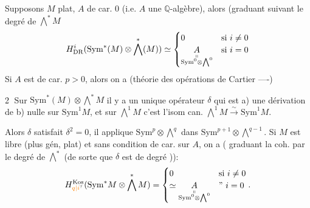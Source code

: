 Supposons $M$ plat,  $A$ de car. 0 (i.e. $A$ une $\mathbb Q$-algèbre), alors
 (graduant suivant le degré de $\bigwedge^\ast M$
\[
H^i_{\mathrm{DR}}(\mathrm{Sym}^{\ast}(M)\otimes\bigwedge^{\ast}(M))\simeq
\begin{cases}0&\text{si }i\ne0\\
\underset{\substack{\shortparallel\\[-2pt]\mathrm{Sym}^{0}\otimes\bigwedge^{0}}}{A}&\text{si }i=0\end{cases}
\]
Si $A$ est de car. $p>0$, alors on a  (théorie des opérations de Cartier ----)

\textcircled{2} Sur $\mathrm{Sym}^{\ast}(M)\otimes\bigwedge^\ast M$  il y a un unique opérateur $\delta$ qui est 
a) une dérivation  de  
b) nulle sur  $\mathrm{Sym}^{1}M$, et sur $\bigwedge^{1}M$ c'est l'isom can. $\bigwedge^{1}M\xrightarrow{\sim}\mathrm{Sym}^{1}M$.

Alors $\delta$ satisfait $\delta^2=0$, il applique $\mathrm{Sym}^{p}\otimes\bigwedge^{q}$ dans $\mathrm{Sym}^{p+1}\otimes\bigwedge^{q-1}$. Si $M$ est libre (plus gén, plat) et sans condition de car. sur $A$, on a ( graduant la coh. par le degré de $\bigwedge^{\ast}$ 
(de sorte que $\delta$ est de degré )):
\[
H^{\mathrm{Kos}}_{\unsure{q|i}}(\mathrm{Sym}^{\ast}M\otimes\bigwedge^\ast M)=
\begin{cases}0&\text{si }i\ne0\\
\simeq\underset{\substack{\shortparallel\\[-2pt]\mathrm{Sym}^{0}\otimes\bigwedge^{0}}}{A}&\text{'' }i=0\end{cases}.
\]
